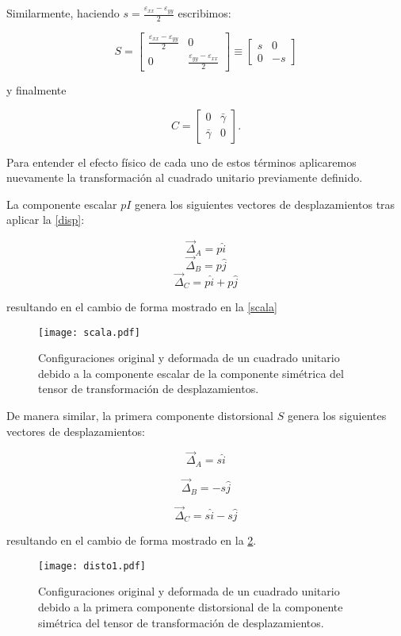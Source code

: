 \documentclass[../notas medios.tex]{subfiles}
\begin{document}
Similarmente, haciendo $s = \frac{{{\varepsilon _{xx}} - {\varepsilon _{yy}}}}{2}$ escribimos:


\[S = \left[ {\begin{array}{*{20}{c}}
{\frac{{{\varepsilon _{xx}} - {\varepsilon _{yy}}}}{2}}&0\\
0&{\frac{{{\varepsilon _{yy}} - {\varepsilon _{xx}}}}{2}}
\end{array}} \right] \equiv \left[ {\begin{array}{*{20}{c}}
s&0\\
0&{ - s}
\end{array}} \right]\]

y finalmente

\[C = \left[ {\begin{array}{*{20}{c}}
0&\bar{\gamma} \\
\bar{\gamma} &0
\end{array}} \right].\]

Para entender el efecto físico de cada uno de estos términos aplicaremos nuevamente la transformación al cuadrado unitario previamente definido.

La componente escalar $pI$ genera los siguientes vectores de desplazamientos tras aplicar la \cref{disp}:

\[{{\vec \Delta }_A} = p\hat i\]
\[{{\vec \Delta }_B} = p\hat j\]
\[{{\vec \Delta }_C} = p\hat i + p\hat j\]

resultando en el cambio de forma mostrado en la \cref{scala}

\begin{figure}[H]
\centering
	\texttt{[image: scala.pdf]}
	\caption{Configuraciones original y deformada de un cuadrado unitario debido a la componente escalar de la componente simétrica del tensor de transformación de desplazamientos.}
	\label{escalar}
\end{figure}

De manera similar, la primera componente distorsional $S$ genera los siguientes vectores de desplazamientos:

\[{{\vec \Delta }_A} = s\hat i\]

\[{{\vec \Delta }_B} =  - s\hat j\]

\[{{\vec \Delta }_C} = s\hat i - s\hat j\]

resultando en el cambio de forma mostrado en la \cref{disto1}.

\begin{figure}[H]
\centering
	\texttt{[image: disto1.pdf]}
	\caption{Configuraciones original y deformada de un cuadrado unitario debido a la primera componente distorsional de la componente simétrica del tensor de transformación de desplazamientos.}
	\label{disto1}
\end{figure}
\end{document}
